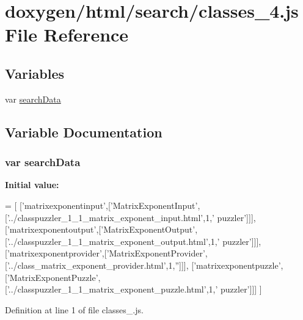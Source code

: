 \hypertarget{a00065}{}\section{doxygen/html/search/classes\+\_\+4.js File Reference}
\label{a00065}
\subsection*{Variables}
\begin{DoxyCompactItemize}
\item 
var \hyperlink{a00065_ad01a7523f103d6242ef9b0451861231e}{search\+Data}
\end{DoxyCompactItemize}


\subsection{Variable Documentation}
\hypertarget{a00065_ad01a7523f103d6242ef9b0451861231e}{}
\subsubsection[{search\+Data}]{\setlength{\rightskip}{0pt plus 5cm}var search\+Data}\label{a00065_ad01a7523f103d6242ef9b0451861231e}
{\bfseries Initial value\+:}
\begin{DoxyCode}
=
[
  [\textcolor{stringliteral}{'matrixexponentinput'},[\textcolor{stringliteral}{'MatrixExponentInput'},[\textcolor{stringliteral}{'../classpuzzler\_1\_1\_matrix\_exponent\_input.html'},1,\textcolor{stringliteral}{'
      puzzler'}]]],
  [\textcolor{stringliteral}{'matrixexponentoutput'},[\textcolor{stringliteral}{'MatrixExponentOutput'},[\textcolor{stringliteral}{'../classpuzzler\_1\_1\_matrix\_exponent\_output.html'},1,\textcolor{stringliteral}{'
      puzzler'}]]],
  [\textcolor{stringliteral}{'matrixexponentprovider'},[\textcolor{stringliteral}{'MatrixExponentProvider'},[\textcolor{stringliteral}{'../class\_matrix\_exponent\_provider.html'},1,\textcolor{stringliteral}{''}]]],
  [\textcolor{stringliteral}{'matrixexponentpuzzle'},[\textcolor{stringliteral}{'MatrixExponentPuzzle'},[\textcolor{stringliteral}{'../classpuzzler\_1\_1\_matrix\_exponent\_puzzle.html'},1,\textcolor{stringliteral}{'
      puzzler'}]]]
]
\end{DoxyCode}


Definition at line 1 of file classes\+\_.\+js.

